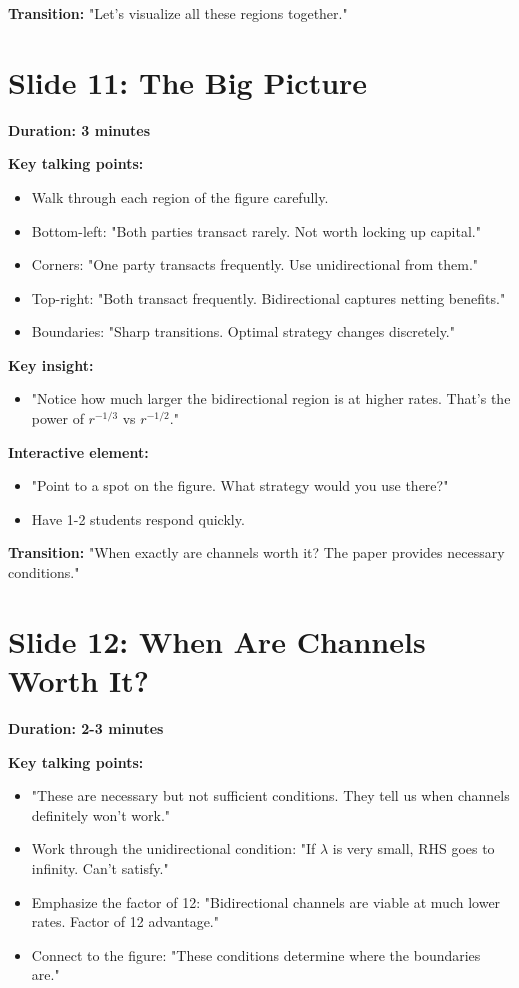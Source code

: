 \documentclass[11pt]{article}
\begin{document}
\textbf{Transition:} "Let's visualize all these regions together."

\section*{Slide 11: The Big Picture}

\textbf{Duration: 3 minutes}

\textbf{Key talking points:}
\begin{itemize}
    \item Walk through each region of the figure carefully.
    \item Bottom-left: "Both parties transact rarely. Not worth locking up capital."
    \item Corners: "One party transacts frequently. Use unidirectional from them."
    \item Top-right: "Both transact frequently. Bidirectional captures netting benefits."
    \item Boundaries: "Sharp transitions. Optimal strategy changes discretely."
\end{itemize}

\textbf{Key insight:}
\begin{itemize}
    \item "Notice how much larger the bidirectional region is at higher rates. That's the power of $r^{-1/3}$ vs $r^{-1/2}$."
\end{itemize}

\textbf{Interactive element:}
\begin{itemize}
    \item "Point to a spot on the figure. What strategy would you use there?"
    \item Have 1-2 students respond quickly.
\end{itemize}

\textbf{Transition:} "When exactly are channels worth it? The paper provides necessary conditions."

\section*{Slide 12: When Are Channels Worth It?}

\textbf{Duration: 2-3 minutes}

\textbf{Key talking points:}
\begin{itemize}
    \item "These are necessary but not sufficient conditions. They tell us when channels definitely won't work."
    \item Work through the unidirectional condition: "If $\lambda$ is very small, RHS goes to infinity. Can't satisfy."
    \item Emphasize the factor of 12: "Bidirectional channels are viable at much lower rates. Factor of 12 advantage."
    \item Connect to the figure: "These conditions determine where the boundaries are."
\end{itemize}
\end{document}
